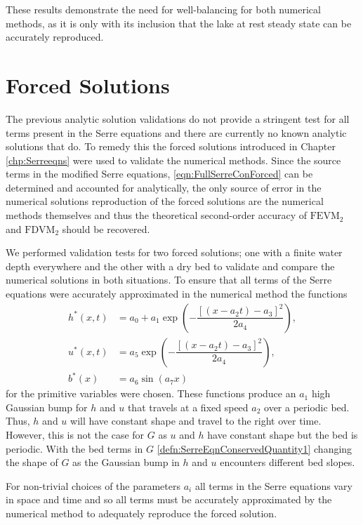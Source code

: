 These results demonstrate the need for well-balancing for both numerical methods, as it is only with its inclusion that the lake at rest steady state can be accurately reproduced. 


\section{Forced Solutions}
The previous analytic solution validations do not provide a stringent test for all terms present in the Serre equations and there are currently no known analytic solutions that do. To remedy this the forced solutions introduced in Chapter \ref{chp:Serreeqns} were used to validate the numerical methods. Since the source terms in the modified Serre equations, \eqref{eqn:FullSerreConForced} can be determined and accounted for analytically, the only source of error in the numerical solutions reproduction of the forced solutions are the numerical methods themselves and thus the theoretical second-order accuracy of $\text{FEVM}_2$ and $\text{FDVM}_2$ should be recovered. 

We performed validation tests for two forced solutions; one with a finite water depth everywhere and the other with a dry bed to validate and compare the numerical solutions in both situations. To ensure that all terms of the Serre equations were accurately approximated in the numerical method the functions
\begin{subequations}
\begin{align}
\label{eqn:ForcedSolutionxt}
h^*(x,t) &= a_0 + a_1 \exp\left(-\dfrac{\left[\left(x - a_2 t\right) - a_3\right]^2}{2 a_4}\right), \\
u^*(x,t) &= a_5 \exp\left(-\dfrac{\left[\left(x - a_2 t\right) - a_3\right]^2}{2 a_4}\right), \\
b^*(x) &= a_6 \sin\left(a_7 x\right)
\end{align}
\end{subequations}
for the primitive variables were chosen. These functions produce an $a_1$ high Gaussian bump for $h$ and $u$ that travels at a fixed speed $a_2$ over a periodic bed. Thus, $h$ and $u$ will have constant shape and travel to the right over time. However, this is not the case for $G$ as $u$ and $h$ have constant shape but the bed is periodic. With the bed terms in $G$ \eqref{defn:SerreEqnConservedQuantity1} changing the shape of $G$ as the Gaussian bump in $h$ and $u$ encounters different bed slopes.

For non-trivial choices of the parameters $a_i$ all terms in the Serre equations vary in space and time and so all terms must be accurately approximated by the numerical method to adequately reproduce the forced solution. 


